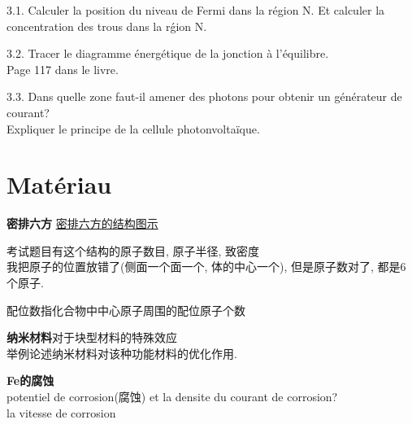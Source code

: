 \documentclass[openany]{article}
\begin{document}
3.1. Calculer la position du niveau de Fermi dans la r\'egion N. Et calculer la concentration des trous dans la r\'gion N.

3.2. Tracer le diagramme \'energ\'etique de la jonction \`a l'\'equilibre.\\
Page 117 dans le livre.

3.3. Dans quelle zone faut-il amener des photons pour obtenir un g\'en\'erateur de courant?\\
Expliquer le principe de la cellule photonvolta\"ique.

\section{Mat\'eriau}
\textbf{密排六方}
\href{(http://rg.nx8.net/Up_files/news/2006-2-27_18285831182/1.JPG}{密排六方的结构图示}

考试题目有这个结构的原子数目, 原子半径, 致密度\\
我把原子的位置放错了(侧面一个面一个, 体的中心一个), 但是原子数对了, 都是6个原子.

配位数指化合物中中心原子周围的配位原子个数

\textbf{纳米材料}对于块型材料的特殊效应\\
举例论述纳米材料对该种功能材料的优化作用.

\textbf{Fe的腐蚀}\\
potentiel de corrosion(腐蚀) et la densite du courant de corrosion?\\
la vitesse de corrosion
\end{document}
